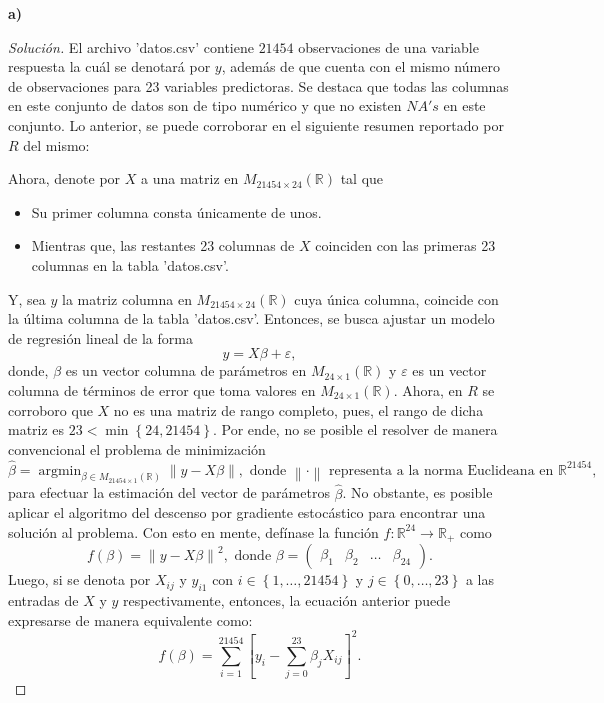 \documentclass[10.5pt,notitlepage]{article}
\newenvironment{solucion}
  {\begin{proof}[Solución]}
  {\end{proof}}
\DeclareMathOperator{\argmin}{argmin}
\newcommand{\RR}{\mathbb{R}}
\newcommand{\ee}{\varepsilon}
\newcommand{\norm}[1]{\left\| #1 \right\|}
\newcommand{\corch}[1]{\left[ #1 \right]}
\newcommand{\kis}[1]{\left\{ #1 \right\}}
\theoremstyle{plain}
\begin{document}
\textbf{a)} 
\begin{solucion}
El archivo 'datos.csv' contiene \(21454\) observaciones de una variable respuesta la cuál se denotará por \(y\), además de que cuenta con el mismo número de observaciones para 23 variables predictoras. Se destaca que todas las columnas en este conjunto de datos son de tipo numérico y que no existen \(NA's\) en este conjunto. Lo anterior, se puede corroborar en  el siguiente resumen reportado por \(R\) del mismo:



Ahora, denote por \(X\) a una matriz en \(M_{21454 \times 24}(\RR)\) tal que 
\begin{itemize}
    \item Su primer columna consta únicamente de unos.
    \item Mientras que, las restantes 23 columnas de \(X\) coinciden con las primeras 23 columnas en la tabla 'datos.csv'. 
\end{itemize}
Y, sea \(y\) la matriz columna en \(M_{21454 \times 24}(\RR)\) cuya única columna, coincide con la última columna de la tabla 'datos.csv'. Entonces, se busca ajustar un modelo de regresión lineal de la forma 
\[
y = X \beta + \ee,
\]
donde, \(\beta\) es un vector columna de parámetros en \(M_{24 \times 1}(\RR)\) y \(\ee\) es un vector columna de términos de error que toma valores en \(M_{24 \times 1}(\RR)\). Ahora, en \(R\) se corroboro que \(X\) no es una matriz de rango completo, pues, el rango de dicha matriz es \(23 < \min\kis{24,21454}\). Por ende, no se posible el resolver de manera convencional el problema de minimización 
\[
 \hat{\beta} = \argmin_{\beta\in M_{21454 \times 1}(\RR)}\norm{y - X \beta}, \text{ donde } \norm{\cdot}  \text{ representa a la norma Euclideana en } \RR^{21454},
\]
para efectuar la estimación del vector de parámetros \(\hat{\beta}\). No obstante, es posible aplicar el algoritmo del descenso por gradiente estocástico para encontrar una solución al problema. Con esto en mente, defínase la función \(f:\RR^24 \to \RR_{+}\) como
\[
f(\beta) = \norm{y - X \beta}^2, \text{ donde } \beta = \begin{pmatrix}\beta_1 & \beta_2 &\hdots& \beta_{24}\end{pmatrix}.
\] 
Luego, si se denota por \(X_{ij}\) y \(y_{i1}\) con \(i \in \kis{1, \hdots, 21454}\) y \(j \in \kis{0,\hdots,23}\) a las entradas de \(X\) y \(y\) respectivamente, entonces, la ecuación anterior puede expresarse de manera equivalente como: 
\begin{equation*}
    f(\beta) = \sum_{i = 1}^{21454}\corch{y_i - \sum_{j = 0}^{23}\beta_jX_{ij} }^2.

\end{equation*}
\end{solucion}
\end{document}
